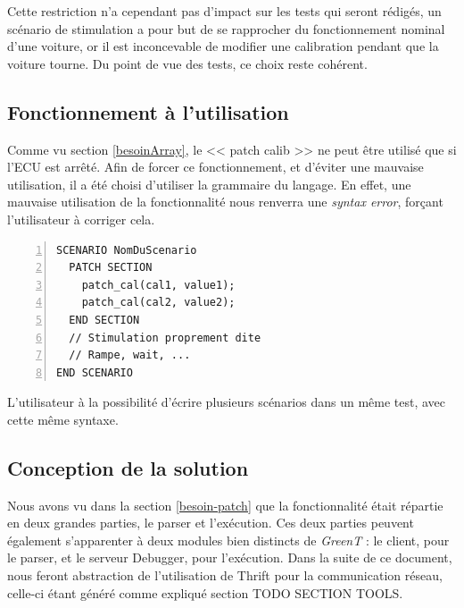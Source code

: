		Cette restriction n'a cependant pas d'impact sur les tests qui seront rédigés, un scénario de stimulation a pour but de se rapprocher du fonctionnement nominal d'une voiture, or il est inconcevable de modifier une calibration pendant que la voiture tourne. Du point de vue des tests, ce choix reste cohérent. 

\subsection{Fonctionnement à l'utilisation}
Comme vu section \ref{besoinArray}, le << patch calib >> ne peut être utilisé que si l'ECU est arrêté. Afin de forcer ce fonctionnement, et d'éviter une mauvaise utilisation, il a été choisi d'utiliser la grammaire du langage. En effet, une mauvaise utilisation de la fonctionnalité nous renverra une \textit{syntax error}, forçant l'utilisateur à corriger cela. 

\begin{lstlisting}[language=gtl,numbers=left,caption=Scénario de stimulation contenant des patchs de calibration]
SCENARIO NomDuScenario
  PATCH SECTION
    patch_cal(cal1, value1);
    patch_cal(cal2, value2);
  END SECTION
  // Stimulation proprement dite
  // Rampe, wait, ...
END SCENARIO
\end{lstlisting}
L'utilisateur à la possibilité d'écrire plusieurs scénarios dans un même test, avec cette même syntaxe.

\subsection{Conception de la solution}
	Nous avons vu dans la section \ref{besoin-patch} que la fonctionnalité était répartie en deux grandes parties, le parser et l'exécution. Ces deux parties peuvent également s'apparenter à deux modules bien distincts de \textit{GreenT} : le client, pour le parser, et le serveur Debugger, pour l'exécution. Dans la suite de ce document, nous feront abstraction de l'utilisation de Thrift pour la communication réseau, celle-ci étant généré comme expliqué section TODO SECTION TOOLS.
	

